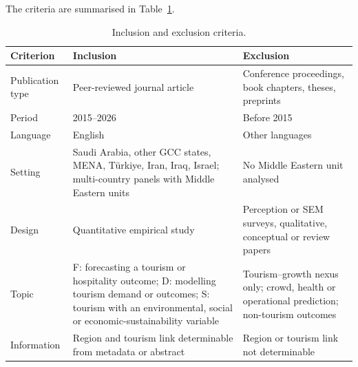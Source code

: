 \documentclass[11pt,a4paper]{article}
\begin{document}
 The criteria are summarised in Table~\ref{tab:criteria}.

\begin{table}[t]\centering\small
\caption{Inclusion and exclusion criteria.}\label{tab:criteria}
\begin{tabularx}{\linewidth}{@{}p{2.6cm}XX@{}}
\toprule
Criterion & Inclusion & Exclusion\\
\midrule
Publication type & Peer-reviewed journal article & Conference proceedings, book chapters, theses, preprints\\
Period & 2015--2026 & Before 2015\\
Language & English & Other languages\\
Setting & Saudi Arabia, other GCC states, MENA, T\"urkiye, Iran, Iraq, Israel; multi-country panels with Middle Eastern units & No Middle Eastern unit analysed\\
Design & Quantitative empirical study & Perception or SEM surveys, qualitative, conceptual or review papers\\
Topic & F: forecasting a tourism or hospitality outcome; D: modelling tourism demand or outcomes; S: tourism with an environmental, social or economic-sustainability variable & Tourism--growth nexus only; crowd, health or operational prediction; non-tourism outcomes\\
Information & Region and tourism link determinable from metadata or abstract & Region or tourism link not determinable\\
\bottomrule
\end{tabularx}
\end{table}
\end{document}

